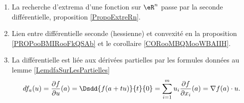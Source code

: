 \begin{enumerate}
    \item
        La recherche d'extrema d'une fonction sur \( \eR^n\) passe par la seconde différentielle, proposition \ref{PropoExtreRn}.
    \item
        Lien entre différentielle seconde (hessienne) et convexité en la proposition \ref{PROPooBMIRooFkQSAb} et le corollaire \ref{CORooMBQMooWBAIIH}.
    \item
        La différentielle est liée aux dérivées partielles par les formules données au lemme \ref{LemdfaSurLesPartielles}
	\begin{equation}
        df_a(u)=\frac{ \partial f }{ \partial u }(a)=\Dsdd{ f(a+tu) }{t}{0}=\sum_{i=1}^mu_i\frac{ \partial f }{ \partial x_i }(a)=\nabla f(a)\cdot u.
	\end{equation}
\end{enumerate}
